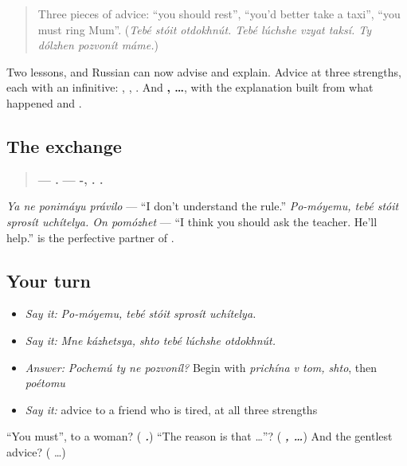 \label{lesson:RU-C264-review}



\begin{quote}
Three pieces of advice: \textquotedblleft{}you should rest\textquotedblright{}, \textquotedblleft{}you'd better take a taxi\textquotedblright{}, \textquotedblleft{}you must ring Mum\textquotedblright{}. (\emph{Tebé stóit otdokhnút. Tebé lúchshe vzyat taksí. Ty dólzhen pozvonít máme.})
\end{quote}

\begin{grammarlens}[title={What you've built}]
Two lessons, and Russian can now advise and explain. Advice at three strengths, each with an infinitive: \textbf{ }, \textbf{}, \textbf{ }. And \textbf{  ,  …}, with the explanation built from what happened and \textbf{}.
\end{grammarlens}

\subsection*{The exchange}
\begin{quote}
\textbf{—    .} \textbf{— -,    .  .}
\end{quote}

\emph{Ya ne ponimáyu právilo} — \textquotedblleft{}I don't understand the rule.\textquotedblright{} \emph{Po-móyemu, tebé stóit sprosít uchítelya. On pomózhet} — \textquotedblleft{}I think you should ask the teacher. He'll help.\textquotedblright{} \textbf{} is the perfective partner of \emph{}.

\subsection*{Your turn}
\begin{itemize}
\raggedright
  \item \emph{Say it:} \emph{Po-móyemu, tebé stóit sprosít uchítelya.}
  \item \emph{Say it:} \emph{Mne kázhetsya, shto tebé lúchshe otdokhnút.}
  \item \emph{Answer:} \emph{Pochemú ty ne pozvoníl?} Begin with \emph{prichína v tom, shto}, then \emph{poétomu}
  \item \emph{Say it:} advice to a friend who is tired, at all three strengths
\end{itemize}

\begin{tcolorbox}[breakable,colback=teal!4,colframe=teal!35!black,title={Before you move on}]
\textquotedblleft{}You must\textquotedblright{}, to a woman? (\emph{\textbf{ .}}) \textquotedblleft{}The reason is that …\textquotedblright{}? (\emph{\textbf{  ,  …}}) And the gentlest advice? (\emph{\textbf{ }} …)
\end{tcolorbox}
